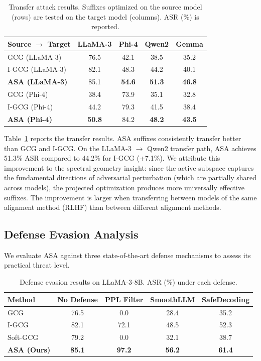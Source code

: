 ﻿\documentclass[lettersize,journal]{IEEEtran}
\begin{document}
\begin{table}[t]
\centering
\caption{Transfer attack results. Suffixes optimized on the source model (rows) are tested on the target model (columns). ASR (\%) is reported.}
\label{tab:transfer}
\begin{tabular}{lcccc}
\toprule
\textbf{Source $\to$ Target} & \textbf{LLaMA-3} & \textbf{Phi-4} & \textbf{Qwen2} & \textbf{Gemma} \\
\midrule
GCG (LLaMA-3) & 76.5 & 42.1 & 38.5 & 35.2 \\
I-GCG (LLaMA-3) & 82.1 & 48.3 & 44.2 & 40.1 \\
\rowcolor[gray]{0.9}
\textbf{ASA (LLaMA-3)} & 85.1 & \textbf{54.6} & \textbf{51.3} & \textbf{46.8} \\
\midrule
GCG (Phi-4) & 38.4 & 73.9 & 35.1 & 32.8 \\
I-GCG (Phi-4) & 44.2 & 79.3 & 41.5 & 38.4 \\
\rowcolor[gray]{0.9}
\textbf{ASA (Phi-4)} & \textbf{50.8} & 84.2 & \textbf{48.2} & \textbf{43.5} \\
\bottomrule
\end{tabular}
\end{table}

Table~\ref{tab:transfer} reports the transfer results. ASA suffixes consistently transfer better than GCG and I-GCG. On the LLaMA-3 $\to$ Qwen2 transfer path, ASA achieves 51.3\% ASR compared to 44.2\% for I-GCG (+7.1\%). We attribute this improvement to the spectral geometry insight: since the active subspace captures the fundamental directions of adversarial perturbation (which are partially shared across models), the projected optimization produces more universally effective suffixes. The improvement is larger when transferring between models of the same alignment method (RLHF) than between different alignment methods.

\subsection{Defense Evasion Analysis}
\label{sec:defense}

We evaluate ASA against three state-of-the-art defense mechanisms to assess its practical threat level.

\begin{table}[t]
\centering
\caption{Defense evasion results on LLaMA-3-8B. ASR (\%) under each defense.}
\label{tab:defense}
\begin{tabular}{lcccc}
\toprule
\textbf{Method} & \textbf{No Defense} & \textbf{PPL Filter} & \textbf{SmoothLLM} & \textbf{SafeDecoding} \\
\midrule
GCG & 76.5 & 0.0 & 28.4 & 35.2 \\
I-GCG & 82.1 & 72.1 & 48.5 & 52.3 \\
Soft-GCG & 79.2 & 0.0 & 32.1 & 38.7 \\
\rowcolor[gray]{0.9}
\textbf{ASA (Ours)} & \textbf{85.1} & \textbf{97.2} & \textbf{56.2} & \textbf{61.4} \\
\bottomrule
\end{tabular}
\end{table}
\end{document}
